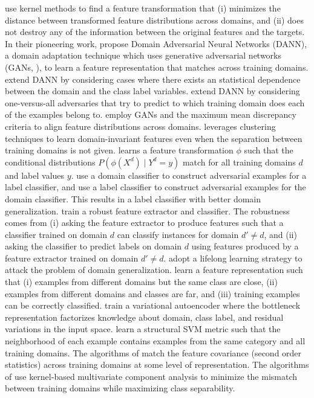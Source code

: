 \documentclass{article}
\begin{document}
\citet{muandet2013domain} use kernel methods to find a feature transformation that (i) minimizes the distance between transformed feature distributions across domains, and (ii) does not destroy any of the information between the original features and the targets.
In their pioneering work, \citet{ganin2016domain} propose Domain Adversarial Neural Networks (DANN), a domain adaptation technique which uses generative adversarial networks (GANs, \citet{goodfellow2014generative}), to learn a feature representation that matches across training domains.
\citet{akuzawa2019adversarial} extend DANN by considering cases where there exists an statistical dependence between the domain and the class label variables.
\citet{albuquerque2019a} extend DANN by considering one-versus-all adversaries that try to predict to which training domain does each of the examples belong to.
\citet{li2018domain} employ GANs and the maximum mean discrepancy criteria \citep{gretton2012kernel} to align feature distributions across domains.
\citet{matsuura2019domain} leverages clustering techniques to learn domain-invariant features even when the separation between training domains is not given.
\citet{li2018domain2, li2018deep} learns a feature transformation $\phi$ such that the conditional distributions $P(\phi(X^d) \mid Y^d=y)$ match for all training domains $d$ and label values $y$.
\citet{shankar2018generalizing} use a domain classifier to construct adversarial examples for a label classifier, and use a label classifier to construct adversarial examples for the domain classifier. This results in a label classifier with better domain generalization. 
\citet{li2019episodic} train a robust feature extractor and classifier. The robustness comes from (i) asking the feature extractor to produce features such that a classifier trained on domain $d$ can classify instances for domain $d' \neq d$, and (ii) asking the classifier to predict labels on domain $d$ using features produced by a feature extractor trained on domain $d' \neq d$. 
\citet{li2020sequential} adopt a lifelong learning strategy to attack the problem of domain generalization.
\citet{motiian2017unified} learn a feature representation such that (i) examples from different domains but the same class are close, (ii) examples from different domains and classes are far, and (iii) training examples can be correctly classified.
\citet{ilse2019diva} train a variational autoencoder \citep{kingma2013auto} where the bottleneck representation factorizes knowledge about domain, class label, and residual variations in the input space.
\citet{fang2013unbiased} learn a structural SVM metric such that the neighborhood of each example contains examples from the same category and all training domains.
The algorithms of \citet{sun2016deep, sun2016return, rahman2019correlation} match the feature covariance (second order statistics) across training domains at some level of representation.
The algorithms of \citet{ghifary2016scatter, hu2019domain} use kernel-based multivariate component analysis to minimize the mismatch between training domains while maximizing class separability.
\end{document}
